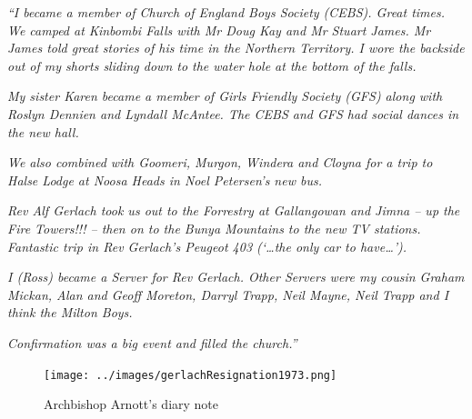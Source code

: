 \emph{``I became a member of Church of England Boys Society (CEBS). Great times. We camped at Kinbombi Falls with Mr Doug Kay and Mr Stuart James. Mr James told great stories of his time in the Northern Territory. I wore the backside out of my shorts sliding down to the water hole at the bottom of the falls.}



\smallskip


\emph{My sister Karen became a member of Girls Friendly Society (GFS) along with Roslyn Dennien and Lyndall McAntee. The CEBS and GFS had social dances in the new hall.}



\emph{We also combined with Goomeri, Murgon, Windera and Cloyna for a trip to Halse Lodge at Noosa Heads in Noel Petersen's new bus.}



\smallskip


\emph{Rev Alf Gerlach took us out to the Forrestry at Gallangowan and Jimna -- up the Fire Towers!!! -- then on to the Bunya Mountains to the new TV stations. Fantastic trip in Rev Gerlach's Peugeot 403 (`\ldots the only car to have\ldots').}



\smallskip


\emph{I (Ross) became a Server for Rev Gerlach. Other Servers were my cousin Graham Mickan, Alan and Geoff Moreton, Darryl Trapp, Neil Mayne, Neil Trapp and I think the Milton Boys.}



\smallskip


\emph{Confirmation was a big event and filled the church.''}



\medskip








\begin{figure}[!htb]
\begin{center}
\texttt{[image: ../images/gerlachResignation1973.png]}
\caption{Archbishop Arnott's diary note}
\end{center}
\end{figure}




